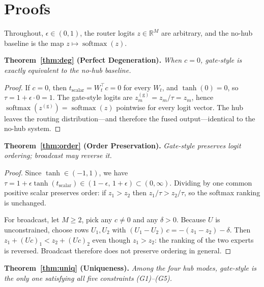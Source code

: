 \documentclass[10pt]{article}
\newcommand{\softmax}{\operatorname{softmax}}
\newcommand{\R}{\mathbb{R}}
\theoremstyle{definition}
\theoremstyle{plain}
\theoremstyle{remark}
\begin{document}
\section{Proofs}
\label{app:proofs}

Throughout, $\epsilon \in (0,1)$, the router logits $z \in \R^M$ are arbitrary, and the no-hub baseline is the map $z \mapsto \softmax(z)$.

\medskip
\noindent\textbf{Theorem~\ref{thm:deg} (Perfect Degeneration).} \emph{When $c = 0$, gate-style is exactly equivalent to the no-hub baseline.}

\begin{proof}
If $c = 0$, then $t_{\text{scalar}} = W_t^\top c = 0$ for every $W_t$, and $\tanh(0) = 0$, so $\tau = 1 + \epsilon \cdot 0 = 1$. The gate-style logits are $z^{(\text{g})}_m = z_m / \tau = z_m$, hence $\softmax(z^{(\text{g})}) = \softmax(z)$ pointwise for every logit vector. The hub leaves the routing distribution---and therefore the fused output---identical to the no-hub system.
\end{proof}

\medskip
\noindent\textbf{Theorem~\ref{thm:order} (Order Preservation).} \emph{Gate-style preserves logit ordering; broadcast may reverse it.}

\begin{proof}
Since $\tanh \in (-1, 1)$, we have $\tau = 1 + \epsilon \tanh(t_{\text{scalar}}) \in (1 - \epsilon,\, 1 + \epsilon) \subset (0, \infty)$. Dividing by one common positive scalar preserves order: if $z_1 > z_2$ then $z_1 / \tau > z_2 / \tau$, so the softmax ranking is unchanged.

For broadcast, let $M \geq 2$, pick any $c \neq 0$ and any $\delta > 0$. Because $U$ is unconstrained, choose rows $U_1, U_2$ with $(U_1 - U_2)\,c = -(z_1 - z_2) - \delta$. Then $z_1 + (Uc)_1 < z_2 + (Uc)_2$ even though $z_1 > z_2$: the ranking of the two experts is reversed. Broadcast therefore does not preserve ordering in general.
\end{proof}

\medskip
\noindent\textbf{Theorem~\ref{thm:uniq} (Uniqueness).} \emph{Among the four hub modes, gate-style is the only one satisfying all five constraints (G1)--(G5).}
\end{document}
